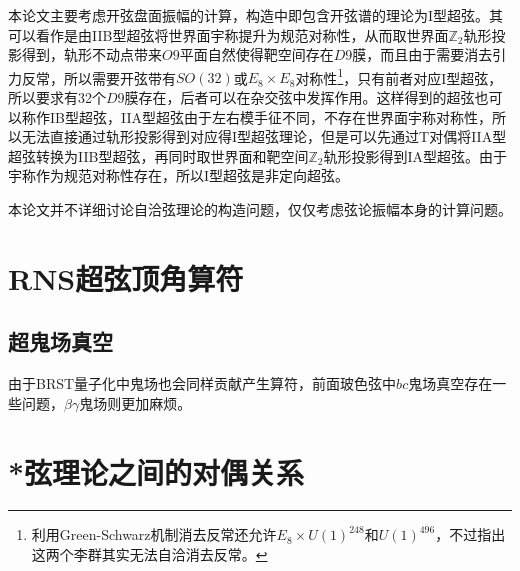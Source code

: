 本论文主要考虑开弦盘面振幅的计算，构造中即包含开弦谱的理论为I型超弦。其可以看作是由IIB型超弦将世界面宇称提升为规范对称性，从而取世界面$\mathbb{Z}_2$轨形投影得到，轨形不动点带来$O9$平面自然使得靶空间存在$D9$膜，而且由于需要消去引力反常，所以需要开弦带有$SO(32)$或$E_8\times E_8$对称性\footnote{利用Green-Schwarz机制消去反常还允许$E_8\times U(1)^{248}$和$U(1)^{496}$，不过\cite{PhysRevLett.105.071601}指出这两个李群其实无法自洽消去反常。}，只有前者对应I型超弦，所以要求有32个$D9$膜存在，后者可以在杂交弦中发挥作用。这样得到的超弦也可以称作IB型超弦，IIA型超弦由于左右模手征不同，不存在世界面宇称对称性，所以无法直接通过轨形投影得到对应得I型超弦理论，但是可以先通过T对偶将IIA型超弦转换为IIB型超弦，再同时取世界面和靶空间$\mathbb{Z}_2$轨形投影得到IA型超弦。由于宇称作为规范对称性存在，所以I型超弦是非定向超弦。

本论文并不详细讨论自洽弦理论的构造问题，仅仅考虑弦论振幅本身的计算问题。

\section{RNS超弦顶角算符}
\subsection{超鬼场真空}
由于BRST量子化中鬼场也会同样贡献产生算符，前面玻色弦中$bc$鬼场真空存在一些问题，$\beta\gamma$鬼场则更加麻烦。

\section{*弦理论之间的对偶关系}
